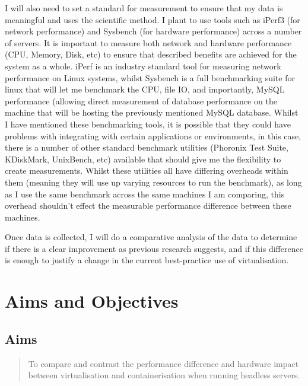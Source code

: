 I will also need to set a standard for measurement to ensure that my data is meaningful and uses the scientific method. I plant to use tools such as iPerf3 (for network performance) and Sysbench (for hardware performance) across a number of servers. It is important to measure both network and hardware performance (CPU, Memory, Disk, etc) to ensure that described  benefits are achieved for the system as a whole. iPerf is an industry standard tool for measuring network performance on Linux systems, whilst Sysbench is a full benchmarking suite for linux that will let me benchmark the CPU, file IO, and importantly, MySQL performance (allowing direct measurement of database performance on the machine that will be hosting the previously mentioned MySQL database. Whilst I have mentioned these benchmarking tools, it is possible that they could have problems with integrating with certain applications or environments, in this case, there is a number of other standard benchmark utilities (Phoronix Test Suite, KDiskMark, UnixBench, etc) available that should give me the flexibility to create measurements. Whilst these utilities all have differing overheads within them (meaning they will use up varying resources to run the benchmark), as long as I use the same benchmark across the same machines I am comparing, this overhead shouldn't effect the measurable performance difference between these machines.

Once data is collected, I will do a comparative analysis of the data to determine if there is a clear improvement as previous research suggests, and if this difference is enough to justify a change in the current best-practice use of virtualisation.

\section{Aims and Objectives}

\subsection{Aims}
\begin{quote}

To compare and contrast the performance difference and hardware impact between virtualisation and containerisation when running headless servers.


\end{quote}

